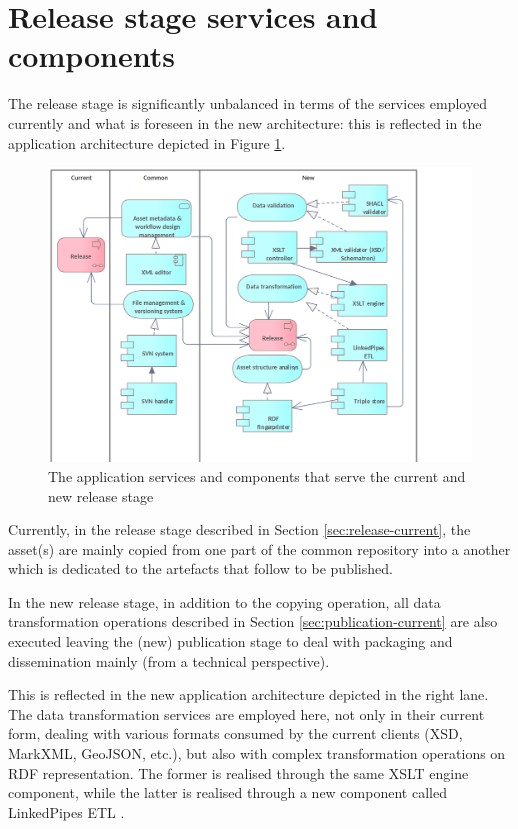	\section{Release stage services and components}
	\label{sec:release-application}	
	
	The release stage is significantly unbalanced in terms of the services employed currently and what is foreseen in the new architecture: this is reflected in the application architecture depicted in Figure \ref{fig:application-release}. 
	
	\begin{figure}[h]
		\centering
		\includegraphics[width=.9\textwidth]{images/application/Release v3.png}
		\caption{The application services and components that serve the current and new release stage}
		\label{fig:application-release}
	\end{figure}

	Currently, in the release stage described in Section \ref{sec:release-current}, the asset(s) are mainly copied from one part of the common repository into a another which is dedicated to the artefacts that follow to be published. 

	In the new release stage, in addition to the copying operation, all data transformation operations described in Section \ref{sec:publication-current} are also executed leaving the (new) publication stage to deal with packaging and dissemination mainly (from a technical perspective).
	
	This is reflected in the new application architecture depicted in the right lane. The data transformation services are employed here, not only in their current form, dealing with various formats consumed by the current clients (XSD, MarkXML, GeoJSON, etc.), but also with complex transformation operations on RDF representation. The former is realised through the same XSLT engine component, while the latter is realised through a new component called LinkedPipes ETL \citep{linkedpipes-klimek2016linkedpipes,linkedpipes-klimek2017linkedpipes}.
	
